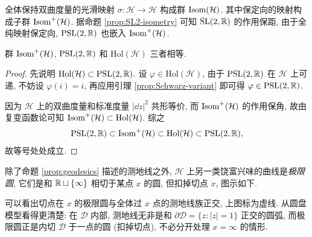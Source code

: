 全体保持双曲度量的光滑映射 $\sigma: \mathcal{H} \to \mathcal{H}$ 构成群 $\operatorname{Isom}(\mathcal{H})$. 其中保定向的映射构成子群 $\operatorname{Isom}^+(\mathcal{H})$. 据命题 \ref{prop:SL2-isometry} 可知 $\operatorname{SL}(2,\mathbb{R})$ 的作用保距, 由于全纯映射保定向, $\operatorname{PSL}(2,\mathbb{R})$ 也嵌入 $\operatorname{Isom}^+(\mathcal{H})$.
\begin{theorem}\label{prop:isometries}
	群 $\operatorname{Isom}^+(\mathcal{H})$, $\operatorname{PSL}(2,\mathbb{R})$ 和 $\mathrm{Hol}(\mathcal{H})$ 三者相等.
\end{theorem}
\begin{proof} 
	先说明 $\mathrm{Hol}(\mathcal{H}) \subset \operatorname{PSL}(2,\mathbb{R})$. 设 $\varphi \in \mathrm{Hol}(\mathcal{H})$, 由于 $\operatorname{PSL}(2,\mathbb{R})$ 在 $\mathcal{H}$ 上可递, 不妨设 $\varphi(i)=i$, 再应用引理 \ref{prop:Schwarz-variant} 即可得 $\varphi \in \operatorname{PSL}(2, \mathbb{R})$.
	
	因为 $\mathcal{H}$ 上的双曲度量和标准度量 $|\dd z|^2$ 共形等价, 而 $\operatorname{Isom}^+(\mathcal{H})$ 的作用保角, 故由复变函数论可知 $\operatorname{Isom}^+(\mathcal{H}) \subset \mathrm{Hol}(\mathcal{H})$. 综之
	\[ \operatorname{PSL}(2,\mathbb{R}) \subset \operatorname{Isom}^+(\mathcal{H}) \subset \mathrm{Hol}(\mathcal{H}) \subset \operatorname{PSL}(2,\mathbb{R}), \]
	故等号处处成立.
\end{proof}

除了命题 \ref{prop:geodesics} 描述的测地线之外, $\mathcal{H}$ 上另一类饶富兴味的曲线是\emph{极限圆}, 它们是和 $\mathbb{R} \sqcup \{\infty\}$ 相切于某点 $x$ 的圆, 但扣掉切点 $x$, 图示如下. 
\begin{center}\qquad
{}
\end{center}
可以看出切点在 $x$ 的极限圆与全体过 $x$ 点的测地线族正交, 上图标为虚线. 从圆盘模型看得更清楚: 在 $\mathcal{D}$ 内部, 测地线无非是和 $\partial\mathcal{D} = \{z: |z|=1\}$ 正交的圆弧, 而极限圆正是内切 $\mathcal{D}$ 于一点的圆 (扣掉切点), 不必分开处理 $x = \infty$ 的情形.

